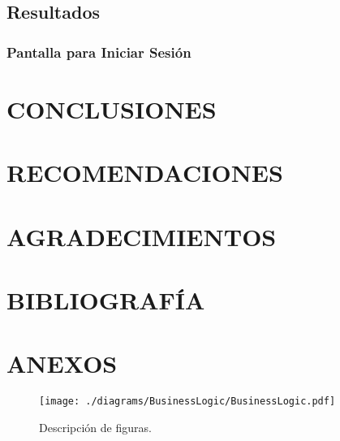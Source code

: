\documentclass[stu, 12pt, letterpaper, donotrepeattitle, floatsintext, natbib]{apa7}
\begin{document}
\subsection{Resultados}
\subsubsection{Pantalla para Iniciar Sesi\'on}
\section{\large CONCLUSIONES}
\section{\large RECOMENDACIONES}
\section{\large AGRADECIMIENTOS}
\section{\large BIBLIOGRAF\'IA}
\section{\large ANEXOS}
\begin{figure}
    \caption{Descripci\'on de figuras.}
    \texttt{[image: ./diagrams/BusinessLogic/BusinessLogic.pdf]}
\end{figure}
\end{document}
